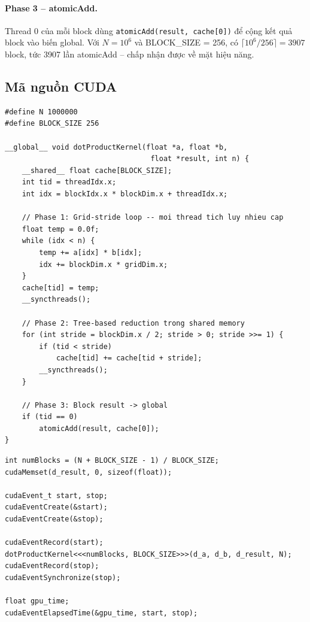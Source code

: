 \documentclass[12pt,a4paper]{article}
\begin{document}
\paragraph{Phase 3 -- atomicAdd.}
Thread 0 của mỗi block dùng \texttt{atomicAdd(result, cache[0])} để cộng kết quả block vào biến global. Với $N = 10^6$ và BLOCK\_SIZE = 256, có $\lceil 10^6 / 256 \rceil = 3907$ block, tức 3907 lần atomicAdd -- chấp nhận được về mặt hiệu năng.

\subsection{Mã nguồn CUDA}

\begin{lstlisting}[style=cudastyle, caption={Kernel Dot Product -- Parallel Reduction}]
#define N 1000000
#define BLOCK_SIZE 256

__global__ void dotProductKernel(float *a, float *b, 
                                  float *result, int n) {
    __shared__ float cache[BLOCK_SIZE];
    int tid = threadIdx.x;
    int idx = blockIdx.x * blockDim.x + threadIdx.x;

    // Phase 1: Grid-stride loop -- moi thread tich luy nhieu cap
    float temp = 0.0f;
    while (idx < n) {
        temp += a[idx] * b[idx];
        idx += blockDim.x * gridDim.x;
    }
    cache[tid] = temp;
    __syncthreads();

    // Phase 2: Tree-based reduction trong shared memory
    for (int stride = blockDim.x / 2; stride > 0; stride >>= 1) {
        if (tid < stride)
            cache[tid] += cache[tid + stride];
        __syncthreads();
    }

    // Phase 3: Block result -> global
    if (tid == 0)
        atomicAdd(result, cache[0]);
}
\end{lstlisting}

\begin{lstlisting}[style=cudastyle, caption={Host code -- Dot Product}, firstnumber=30]
int numBlocks = (N + BLOCK_SIZE - 1) / BLOCK_SIZE;
cudaMemset(d_result, 0, sizeof(float));

cudaEvent_t start, stop;
cudaEventCreate(&start);
cudaEventCreate(&stop);

cudaEventRecord(start);
dotProductKernel<<<numBlocks, BLOCK_SIZE>>>(d_a, d_b, d_result, N);
cudaEventRecord(stop);
cudaEventSynchronize(stop);

float gpu_time;
cudaEventElapsedTime(&gpu_time, start, stop);
\end{lstlisting}
\end{document}
